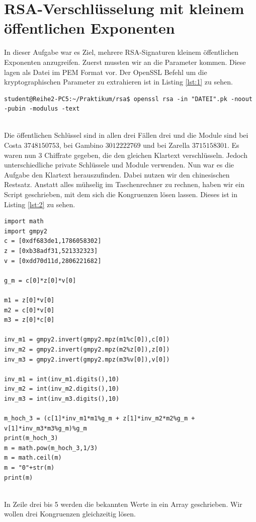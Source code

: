 \documentclass{article}
\begin{document}
\section{RSA-Verschlüsselung mit kleinem öffentlichen Exponenten}
In dieser Aufgabe war es Ziel, mehrere RSA-Signaturen kleinem öffentlichen Exponenten anzugreifen. Zuerst mussten wir an die Parameter kommen. Diese lagen als Datei im PEM Format vor. Der OpenSSL Befehl um die kryptographischen Parameter zu extrahieren ist in Listing \ref{lst:1} zu sehen.
\begin{lstlisting}[caption={OpenSSH Befehl für RSA Parameter aus PEM Datei},captionpos=b,float=ht!,label=lst:1]
student@Reihe2-PC5:~/Praktikum/rsa$ openssl rsa -in "DATEI".pk -noout -pubin -modulus -text
\end{lstlisting}
\\Die öffentlichen Schlüssel sind in allen drei Fällen drei und die Module sind bei Costa $3748150753$, bei Gambino $3012222769$ und bei Zarella $3715158301$. Es waren nun 3 Chiffrate gegeben, die den gleichen Klartext verschlüsseln. Jedoch unterschiedliche private Schlüssele und Module verwenden. Nun war es die Aufgabe den Klartext herauszufinden. Dabei nutzen wir den chinesischen Restsatz. Anstatt alles mühselig im Taschenrechner zu rechnen, haben wir ein Script geschrieben, mit dem sich die Kongruenzen lösen lassen. Dieses ist in Listing \ref{lst:2} zu sehen.
\begin{lstlisting}[caption={Script zum lösen dreier linearer Kongruenzen},captionpos=b,float=ht!,label=lst:2]
import math
import gmpy2
c = [0xdf683de1,1786058302]
z = [0xb38adf31,521332323]
v = [0xdd70d11d,2806221682]

g_m = c[0]*z[0]*v[0]

m1 = z[0]*v[0]
m2 = c[0]*v[0]
m3 = z[0]*c[0]

inv_m1 = gmpy2.invert(gmpy2.mpz(m1%c[0]),c[0])
inv_m2 = gmpy2.invert(gmpy2.mpz(m2%z[0]),z[0])
inv_m3 = gmpy2.invert(gmpy2.mpz(m3%v[0]),v[0])

inv_m1 = int(inv_m1.digits(),10)
inv_m2 = int(inv_m2.digits(),10)
inv_m3 = int(inv_m3.digits(),10)

m_hoch_3 = (c[1]*inv_m1*m1%g_m + z[1]*inv_m2*m2%g_m + v[1]*inv_m3*m3%g_m)%g_m
print(m_hoch_3)
m = math.pow(m_hoch_3,1/3)
m = math.ceil(m)
m = "0"+str(m)
print(m)
\end{lstlisting}
\\In Zeile drei bis 5 werden die bekannten Werte in ein Array geschrieben. Wir wollen drei Kongruenzen gleichzeitig lösen. \\
\end{document}
